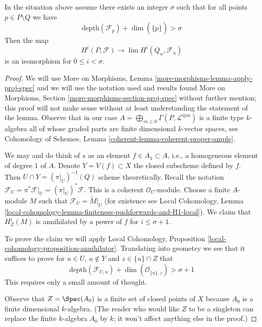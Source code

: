 \begin{proposition}
\label{proposition-lefschetz}
In the situation above assume there exists an integer $\sigma$ such that
for all points $p \in P \setminus Q$ we have
$$
\text{depth}(\mathcal{F}_p) + \dim(\overline{\{p\}}) > \sigma
$$
Then the map
$$
H^i(P, \mathcal{F}) \longrightarrow \lim H^i(Q_n, \mathcal{F}_n)
$$
is an isomorphism for $0 \leq i < \sigma$.
\end{proposition}

\begin{proof}
We will use More on Morphisms, Lemma \ref{more-morphisms-lemma-apply-proj-spec}
and we will use the notation used and results found
More on Morphisms, Section \ref{more-morphisms-section-proj-spec}
without further mention; this proof will not make sense without
at least understanding the statement of the lemma.
Observe that in our case
$A = \bigoplus_{m \geq 0} \Gamma(P, \mathcal{L}^{\otimes m})$
is a finite type $k$-algebra
all of whose graded parts are finite dimensional $k$-vector spaces, see
Cohomology of Schemes, Lemma \ref{coherent-lemma-coherent-proper-ample}.

\medskip\noindent
We may and do think of $s$ as an element $f \in A_1 \subset A$, i.e.,
a homogeneous element of degree $1$ of $A$. Denote
$Y = V(f) \subset X$ the closed subscheme defined by $f$.
Then $U \cap Y = (\pi|_U)^{-1}(Q)$ scheme theoretically.
Recall the notation
$\mathcal{F}_U = \pi^*\mathcal{F}|_U = (\pi|_U)^*\mathcal{F}$.
This is a coherent $\mathcal{O}_U$-module.
Choose a finite $A$-module $M$ such that
$\mathcal{F}_U = \widetilde{M}|_U$
(for existence see Local Cohomology, Lemma
\ref{local-cohomology-lemma-finiteness-pushforwards-and-H1-local}).
We claim that $H^i_Z(M)$ is annihilated by
a power of $f$ for $i \leq \sigma + 1$.

\medskip\noindent
To prove the claim we will apply
Local Cohomology, Proposition \ref{local-cohomology-proposition-annihilator}.
Translating into geometry we see that it suffices to prove
for $u \in U$, $u \not \in Y$ and $z \in \overline{\{u\}} \cap Z$
that
$$
\text{depth}(\mathcal{F}_{U, u}) +
\dim(\mathcal{O}_{\overline{\{u\}}, z}) > \sigma + 1
$$
This requires only a small amount of thought.

\medskip\noindent
Observe that $Z = \Spec(A_0)$ is a finite set of closed points of $X$ because
$A_0$ is a finite dimensional $k$-algebra.
(The reader who would like $Z$ to be a singleton can replace the
finite $k$-algebra $A_0$ by $k$; it won't affect anything else in the proof.)


\end{proof}

